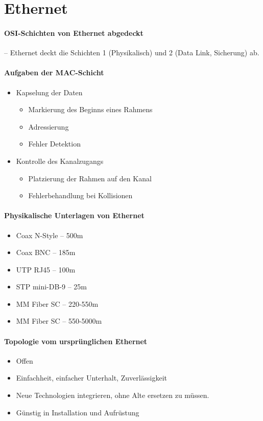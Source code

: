 \documentclass[a4paper,12pt]{article}
\begin{document}
\newpage
\section{Ethernet}

\paragraph{OSI-Schichten von Ethernet abgedeckt} -- Ethernet deckt die Schichten 1 (Physikalisch) und 2 (Data Link, Sicherung) ab.

\paragraph{Aufgaben der MAC-Schicht}
\begin{itemize}
\item Kapselung der Daten
	\begin{itemize}
	\item Markierung des Beginns eines Rahmens
	\item Adressierung
	\item Fehler Detektion
	\end{itemize}
\item Kontrolle des Kanalzugangs
	\begin{itemize}
	\item Platzierung der Rahmen auf den Kanal
	\item Fehlerbehandlung bei Kollisionen
	\end{itemize}
\end{itemize}


\paragraph{Physikalische Unterlagen von Ethernet}
\begin{itemize}
\item Coax N-Style -- 500m
\item Coax BNC -- 185m
\item UTP RJ45 -- 100m
\item STP mini-DB-9 -- 25m
\item MM Fiber SC -- 220-550m
\item MM Fiber SC -- 550-5000m
\end{itemize}

\paragraph{Topologie vom ursprünglichen Ethernet}
\begin{itemize}
\item Offen
\item Einfachheit, einfacher Unterhalt, Zuverlässigkeit
\item Neue Technologien integrieren, ohne Alte ersetzen zu müssen.
\item Günstig in Installation und Aufrüstung
\end{itemize}
\end{document}
